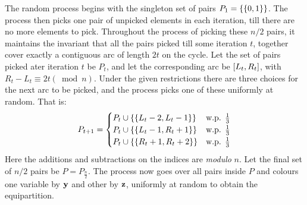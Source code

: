 \vspace{0.5em}


\vspace{0.5em}

The random process begins with the singleton set of pairs $P_1 = \left\{\left\{0,1\right\}\right\}$.
The process then picks one pair of unpicked elements in each iteration, till there are no more elements to pick.
Throughout the process of picking these $n/2$ pairs, it maintains the invariant that all the pairs picked till some iteration $t$, together cover exactly a contiguous arc of length $2t$ on the cycle.
Let the set of pairs picked ater iteration $t$ be $P_t$, and let the corresponding arc be $\left[L_t, R_t\right]$, with $R_t - L_t \equiv 2t (\bmod n)$.
Under the given restrictions there are three choices for the next arc to be picked, and the process picks one of these uniformly at random.
That is:
\[
  P_{t+1} =
  \begin{cases}
    P_t \cup \left\{\left\{L_t - 2, L_t - 1\right\}\right\} &\text{w.p. } \frac{1}{3}\\ 
    P_t \cup \left\{\left\{L_t - 1, R_t + 1\right\}\right\} &\text{w.p. } \frac{1}{3}\\
    P_t \cup \left\{\left\{R_t + 1, R_t + 2\right\}\right\} &\text{w.p. } \frac{1}{3}\\
  \end{cases}
\]
Here the additions and subtractions on the indices are \emph{modulo} $n$.
Let the final set of $n/2$ pairs be $P = P_{\frac{n}{2}}$.
The process now goes over all pairs inside $P$ and colours one variable by $\mathbf{y}$ and other by $\mathbf{z}$, uniformly at random to obtain the equipartition.

